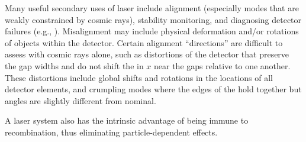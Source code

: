 Many useful secondary uses of laser include alignment (especially modes that are weakly constrained by cosmic rays),
stability monitoring, and diagnosing detector failures (e.g., ).  
Misalignment may include physical deformation and/or rotations of objects within the detector.  Certain alignment ``directions''  are difficult to assess with cosmic rays alone, such as distortions of the detector that preserve the gap widths and do not shift the  in $x$ near the gaps relative to one another.
These distortions include global shifts and rotations in the locations of all detector elements, and crumpling modes where the edges of the  hold together but angles are slightly different from nominal.   


A laser system also has the intrinsic advantage of
being immune to recombination, thus eliminating particle-dependent effects.  

%



